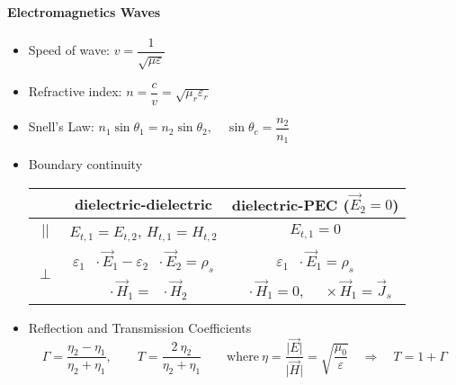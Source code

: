 \documentclass[a4paper, 11pt]{article}
\DeclareMathOperator{\hn}{\hat{\boldsymbol{n}}}
\begin{document}
\paragraph{Electromagnetics Waves}
\begin{itemize}[leftmargin=*]
\item Speed of wave: $v=\dfrac{1}{\sqrt{\mu\varepsilon}}$
\item Refractive index: $ n=\dfrac{c} {v}=\sqrt{\mu_{r}\varepsilon_{r}}$
\item Snell's Law: $n_{1} \sin \theta_{1} = n_{2} \sin \theta_{2}, \quad \sin\theta_{c} = \dfrac{n_{2}}{n_{1}}$

\item Boundary continuity 
\begin{table}[H] 
    \centering
\begin{tabular}{ccc}
\toprule
    & dielectric-dielectric & dielectric-PEC ($\vec{E}_{2}=0$)\\[.2em]
    \midrule
    $||$ & $E_{t,1}=E_{t,2}$,  $H_{t,1}=H_{t,2}$ & $E_{t,1}=0$ \\[.4em]
    
    \multirow{2}{*}{$\perp$} & $\varepsilon_{1}\hn\cdot\vec{E}_{1}-\varepsilon_{2}\hn\cdot\vec{E}_{2}=\rho_{s}$  & $\varepsilon_{1} \hn\cdot\vec{E}_{1}=\rho_{s}$ \\
    &                  $\hn\cdot\vec{H}_{1}=\hn\cdot\vec{H}_{2}$ & $\hn\cdot\vec{H}_{1}=0$, \ $\hn\times \vec{H}_{1}=\vec{J}_{s}$ \\ 
    \bottomrule
\end{tabular}
\end{table}

\item Reflection and Transmission Coefficients
    \[
        \Gamma=\frac{\eta_{2}-\eta_{1}}{\eta_{2}+\eta_{1}}, 
        \quad \quad 
        T=\frac{2 \ \eta_{2}}{\eta_{2}+\eta_{1}}
        \quad \quad 
        \text{where} \ \eta=\frac{\lvert \vec{E} \rvert}{\lvert \vec{H} \rvert}=\sqrt{\frac{\mu_{0}}{\varepsilon}} \quad \Rightarrow \quad T=1+\Gamma 
    \]
    

\end{itemize}
\end{document}
